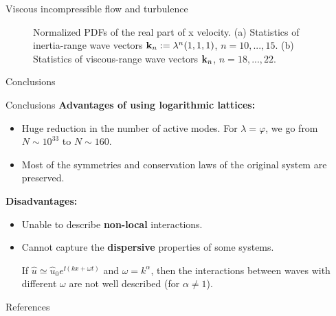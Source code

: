 \documentclass{beamer} %
\begin{document}
\begin{frame}{Viscous incompressible flow and turbulence}
\begin{minipage}{0.59\textwidth}
\begin{figure}
      \caption{Normalized PDFs of the real part of x velocity. (a) Statistics of inertia-range wave vectors $\boldsymbol{\mathrm{k}}_n:=\lambda^n(1,1,1)$, $n=10,...,15$. (b) Statistics of viscous-range wave vectors $\boldsymbol{\mathrm{k}}_n$, $n=18,...,22$. \cite{campolina}}
    \end{figure}
  \end{minipage}
\end{frame}
{
\begin{frame}[plain]
  \centering\vfill\Huge
  Conclusions
  \vfill
\end{frame}
\addtocounter{framenumber}{-1}
}
\begin{frame}{Conclusions}
  \textbf{Advantages of using logarithmic lattices:}
  \begin{itemize}
    \item Huge reduction in the number of active modes. For $\lambda=\varphi$, we go from $N\sim 10^{33}$ to $N\sim 160$.
    \item Most of the symmetries and conservation laws of the original system are preserved.
  \end{itemize}
  \textbf{Disadvantages:}
  \begin{itemize}
    \item Unable to describe \textbf{non-local} interactions.
    \item Cannot capture the \textbf{dispersive} properties of some systems.

          If $\widehat{u}\simeq \widehat{u}_0 e^{\ii (kx + \omega t)}$ and $\omega = k^\alpha$, then the interactions between waves with different $\omega$ are not well described (for $\alpha\neq 1$).
  \end{itemize}
\end{frame}
\begin{frame}[noframenumbering]{References}
  \printbibliography[heading=none]
\end{frame}
\end{document}

